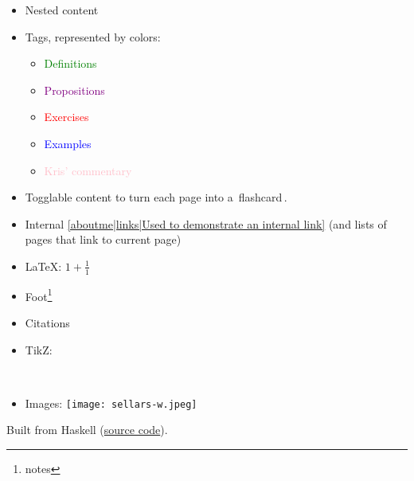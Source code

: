 \begin{itemize}
\item Nested content
\item Tags, represented by colors: \begin{itemize}
\item \textcolor{green}{Definitions}
\item \textcolor{purple}{Propositions}
\item \textcolor{red}{Exercises}
\item \textcolor{blue}{Examples}
\item \textcolor{pink}{Kris' commentary}
\end{itemize}
\item Togglable content to turn each page into a \,flashcard\,.
\item Internal \ref{aboutme|links|Used to demonstrate an internal link} (and lists of pages that link to current page)
\item \LaTeX: $1+\frac{1}{1}$
\item Foot\footnote{notes}
\item Citations \cite{mazieres2005get}
\item TikZ: \
\item Images: \texttt{[image: sellars-w.jpeg]}

\end{itemize}

Built from Haskell (\href{https://github.com/kris-brown/KBKB}{source code}).
